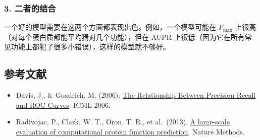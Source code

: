 \hypertarget{ux4e8cux8005ux7684ux7ed3ux5408}{%
\subsubsection{3. 二者的结合}\label{ux4e8cux8005ux7684ux7ed3ux5408}}

一个好的模型需要在这两个方面都表现出色。例如，一个模型可能在 \(F_{\max}\) 上很高（对每个蛋白质都能平均猜对几个功能），但在 AUPR 上很低（因为它在所有常见功能上都犯了很多小错误），这样的模型就不够好。

\hypertarget{ux53c2ux8003ux6587ux732e-31}{%
\subsection{参考文献}\label{ux53c2ux8003ux6587ux732e-31}}

\begin{itemize}
\tightlist
\item
  Davis, J., \& Goadrich, M. (2006). \href{https://doi.org/10.1145/1143844.1143874}{The Relationship Between Precision-Recall and ROC Curves}. ICML 2006.
\item
  Radivojac, P., Clark, W. T., Oron, T. R., et al.~(2013). \href{https://www.nature.com/articles/nmeth.2340}{A large-scale evaluation of computational protein function prediction}. Nature Methods.
\end{itemize}

\clearpage
